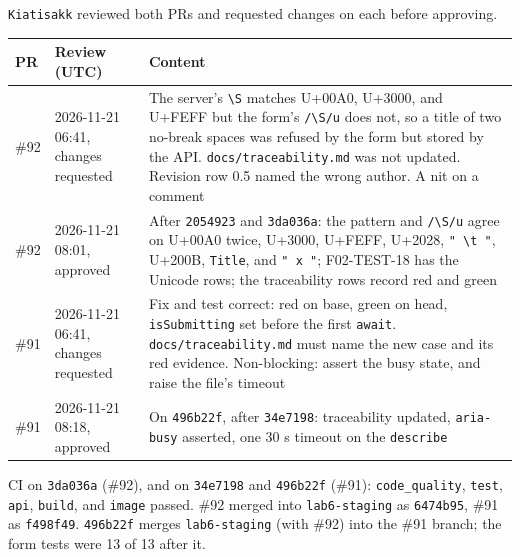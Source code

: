 
\texttt{Kiatisakk} reviewed both PRs and requested changes on each before approving.

\begin{longtable}{@{}R{1.2cm}R{3.4cm}R{11.4cm}@{}}
\toprule \textbf{PR} & \textbf{Review (UTC)} & \textbf{Content} \\ \midrule \endhead
\#92 & 2026-11-21 06:41, changes requested & The server's \texttt{\textbackslash S} matches U+00A0, U+3000, and U+FEFF but the form's \texttt{/\textbackslash S/u} does not, so a title of two no-break spaces was refused by the form but stored by the API. \texttt{docs/traceability.md} was not updated. Revision row 0.5 named the wrong author. A nit on a comment \\
\#92 & 2026-11-21 08:01, approved & After \texttt{2054923} and \texttt{3da036a}: the pattern and \texttt{/\textbackslash S/u} agree on U+00A0 twice, U+3000, U+FEFF, U+2028, \texttt{" \textbackslash t "}, U+200B, \texttt{Title}, and \texttt{" x "}; F02-TEST-18 has the Unicode rows; the traceability rows record red and green \\
\#91 & 2026-11-21 06:41, changes requested & Fix and test correct: red on base, green on head, \texttt{isSubmitting} set before the first \texttt{await}. \texttt{docs/traceability.md} must name the new case and its red evidence. Non-blocking: assert the busy state, and raise the file's timeout \\
\#91 & 2026-11-21 08:18, approved & On \texttt{496b22f}, after \texttt{34e7198}: traceability updated, \texttt{aria-busy} asserted, one 30 s timeout on the \texttt{describe} \\
\bottomrule
\end{longtable}

CI on \texttt{3da036a} (\#92), and on \texttt{34e7198} and \texttt{496b22f} (\#91): \texttt{code\_quality}, \texttt{test}, \texttt{api}, \texttt{build}, and \texttt{image} passed. \#92 merged into \texttt{lab6-staging} as \texttt{6474b95}, \#91 as \texttt{f498f49}. \texttt{496b22f} merges \texttt{lab6-staging} (with \#92) into the \#91 branch; the form tests were 13 of 13 after it.



